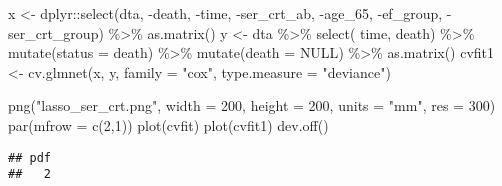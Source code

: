 \documentclass[
]{article}
\newenvironment{Shaded}{\begin{snugshade}}{\end{snugshade}}
\newcommand{\AttributeTok}[1]{\textcolor[rgb]{0.77,0.63,0.00}{#1}}
\newcommand{\ConstantTok}[1]{\textcolor[rgb]{0.00,0.00,0.00}{#1}}
\newcommand{\DecValTok}[1]{\textcolor[rgb]{0.00,0.00,0.81}{#1}}
\newcommand{\FunctionTok}[1]{\textcolor[rgb]{0.00,0.00,0.00}{#1}}
\newcommand{\NormalTok}[1]{#1}
\newcommand{\OtherTok}[1]{\textcolor[rgb]{0.56,0.35,0.01}{#1}}
\newcommand{\SpecialCharTok}[1]{\textcolor[rgb]{0.00,0.00,0.00}{#1}}
\newcommand{\StringTok}[1]{\textcolor[rgb]{0.31,0.60,0.02}{#1}}
\begin{document}
\begin{Shaded}
\begin{Highlighting}[]
\NormalTok{x }\OtherTok{\textless{}{-}}\NormalTok{ dplyr}\SpecialCharTok{::}\FunctionTok{select}\NormalTok{(dta, }\SpecialCharTok{{-}}\NormalTok{death, }\SpecialCharTok{{-}}\NormalTok{time, }\SpecialCharTok{{-}}\NormalTok{ser\_crt\_ab, }\SpecialCharTok{{-}}\NormalTok{age\_65, }\SpecialCharTok{{-}}\NormalTok{ef\_group, }\SpecialCharTok{{-}}\NormalTok{ser\_crt\_group) }\SpecialCharTok{\%\textgreater{}\%} 
        \FunctionTok{as.matrix}\NormalTok{() }
\NormalTok{y }\OtherTok{\textless{}{-}}\NormalTok{ dta }\SpecialCharTok{\%\textgreater{}\%} \FunctionTok{select}\NormalTok{( time, death) }\SpecialCharTok{\%\textgreater{}\%} \FunctionTok{mutate}\NormalTok{(}\AttributeTok{status =}\NormalTok{ death) }\SpecialCharTok{\%\textgreater{}\%} \FunctionTok{mutate}\NormalTok{(}\AttributeTok{death =} \ConstantTok{NULL}\NormalTok{) }\SpecialCharTok{\%\textgreater{}\%} \FunctionTok{as.matrix}\NormalTok{() }
\NormalTok{cvfit1 }\OtherTok{\textless{}{-}} \FunctionTok{cv.glmnet}\NormalTok{(x, y, }\AttributeTok{family =} \StringTok{"cox"}\NormalTok{, }\AttributeTok{type.measure =} \StringTok{"deviance"}\NormalTok{)}

\FunctionTok{png}\NormalTok{(}\StringTok{"lasso\_ser\_crt.png"}\NormalTok{, }\AttributeTok{width =} \DecValTok{200}\NormalTok{, }\AttributeTok{height =} \DecValTok{200}\NormalTok{, }\AttributeTok{units =} \StringTok{"mm"}\NormalTok{, }\AttributeTok{res =} \DecValTok{300}\NormalTok{)}
\FunctionTok{par}\NormalTok{(}\AttributeTok{mfrow =} \FunctionTok{c}\NormalTok{(}\DecValTok{2}\NormalTok{,}\DecValTok{1}\NormalTok{))}
\FunctionTok{plot}\NormalTok{(cvfit)}
\FunctionTok{plot}\NormalTok{(cvfit1)}
\FunctionTok{dev.off}\NormalTok{()}
\end{Highlighting}
\end{Shaded}

\begin{verbatim}
## pdf 
##   2
\end{verbatim}

\begin{Shaded}
\end{Shaded}
\end{document}
